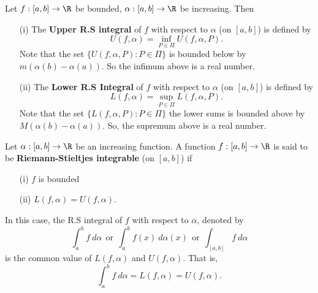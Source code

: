 \begin{definition}
    Let \( f: [a,b] \to \R  \) be bounded, \( \alpha: [a,b] \to \R  \) be increasing. Then 
    \begin{enumerate}
        \item[(i)] The \textbf{Upper R.S integral} of \( f  \) with respect to \( \alpha \) (on \( [a,b] \)) is defined by 
            \[  U(f,\alpha) = \inf_{P \in \Pi} U(f,\alpha, P).   \]
            Note that the set \( \{  U(f,\alpha, P) : P \in \Pi \}   \) is bounded below by \( m (\alpha(b) - \alpha(a)) \). So the infimum above is a real number. 
        \item[(ii)] The \textbf{Lower R.S Integral} of \( f  \) with respect to \( \alpha \) (on \( [a,b] \)) is defined by
            \[  L(f,\alpha) = \sup_{P \in \Pi} L(f,\alpha, P ). \]
            Note that the set \( \{  L(f,\alpha, P ) : P \in \Pi \} \)
            the lower sums is bounded above by \( M(\alpha(b) - \alpha(a)) \). So, the supremum above is a real number.
    \end{enumerate}
\end{definition}

\begin{definition}
    Let \( \alpha : [a,b] \to \R  \) be an increasing function. A function \( f: [a,b] \to \R  \) is said to be \textbf{Riemann-Stieltjes integrable} (on \( [a,b] \)) if 
    \begin{enumerate}
        \item[(i)] \( f \) is bounded
        \item[(ii)] \( L(f,\alpha) = U(f,\alpha) \).
    \end{enumerate}
    In this case, the R.S integral of \( f  \) with respect to \( \alpha \), denoted by
    \[ \int_{ a }^{ b }  f  \ d \alpha \ \ \text{or} \ \ \int_{ a }^{ b }  f(x)  \ d \alpha(x) \ \ \text{or} \ \ \int_{ [a,b] } f   \ d \alpha  \]
    is the common value of \( L(f,\alpha) \) and \( U(f,\alpha) \). That is, 
    \[  \int_{ a }^{ b }  f  \ d \alpha = L (f,\alpha) = U(f,\alpha). \]
\end{definition}

